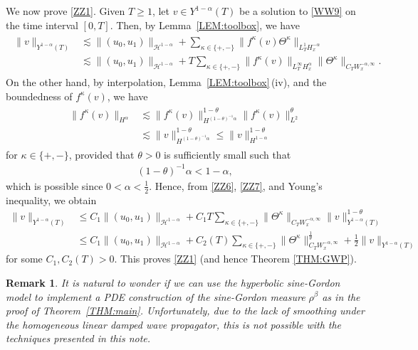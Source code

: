 \documentclass[letterpaper, 11pt,  reqno]{amsart}
\theoremstyle{myremark}
\newtheorem{remark}[theorem]{Remark}
\newcommand{\Ta}{\Theta}
\newcommand{\1}{\hspace{0.5mm}\text{I}\hspace{0.5mm}}
\newcommand{\al}{\alpha}
\newcommand{\be}{\beta}
\newcommand{\kk}{\kappa}
\newcommand{\ta}{\theta}
\newcommand{\les}{\lesssim}
\renewcommand{\H}{\mathcal{H}}
\numberwithin{equation}{section}
\numberwithin{theorem}{section}
\begin{document}
We now prove \eqref{ZZ1}.
Given $T \ge 1$, 
let $v \in Y^{1-\al}(T)$ be a solution to \eqref{WW9} on the time interval $[0, T]$.
Then, 
by 
Lemma~\ref{LEM:toolbox}, 
we have
\begin{align}
\begin{split}
\| v \|_ {Y^{1-\al}(T)} 
&\les \|(u_0, u_1) \|_{\H^{1-\al}}
+ \sum_{\kk \in \{+, -\}} \| f^\kk(v) \Ta^\kk  \|_{L^1_TH^{-\al}_x}\\
& \les
\|(u_0, u_1) \|_{\H^{1-\al}}
+   T
\sum_{\kk \in \{+, -\}}
  \|f^\kk(v) \|_{L^{\infty}_TH^\al_x}\|\Ta^\kk\|_{C_TW^{-\al,\infty}_x}.
\end{split}
\label{ZZ6}
\end{align}
On the other hand, 
by interpolation, Lemma~\ref{LEM:toolbox}\,(iv), 
and the boundedness of $f^\kk(v)$, 
we have 
\begin{align}
\begin{split}
\|f^\kk(v)\|_{H^\al } 
& \les \| f^\kk(v)\|_{H^{(1-\ta)^{-1}\al }}^{1-\ta} \|f^\kk(v)\|_{L^2}^\ta \\
& \les \| v\|_{H^{(1-\ta)^{-1}\al }}^{1-\ta}
 \le \| v\|_{H^{1-\al}}^{1-\ta}
\end{split}
\label{ZZ7}
\end{align}
for $\kk \in \{+, -\}$, provided that  $\ta >0$ is sufficiently small such that 
\begin{align*}
(1-\ta)^{-1}\al  < {1-\al}, 
\end{align*}
which is possible since $0 <  \al <  \frac 12$.
Hence, from \eqref{ZZ6}, \eqref{ZZ7}, and Young's inequality, 
we obtain
\begin{align*}
\|v\|_{Y^{1-\al}(T)}
&  \le C_1 \|(u_0, u_1) \|_{\H^{1-\al}}
 + 
C_1 T
\sum_{\kk \in \{+, -\}}
\|\Ta^\kk\|_{C_TW^{-\al,\infty}_x}
\|v\|_{Y^{1-\al}(T)}^{1-\ta}
\\
&  \le C_1 \|(u_0, u_1) \|_{\H^{1-\al}}
+ C_2(T)  \sum_{\kk \in \{+, -\}} \| \Ta^\kk \|_{C_T W_x^{-\al, \infty}}^\frac1 \ta + \frac{1}{2} 
\|v\|_{Y^{1-\al}(T)}
\end{align*}
for some $C_1, C_2(T) > 0$.
This proves \eqref{ZZ1}
(and hence Theorem \ref{THM:GWP}).










	







\begin{remark}\label{REM:wave2}
It is natural to wonder if we can use 
the hyperbolic sine-Gordon model
to 
 implement a PDE construction of the sine-Gordon measure $\rho^\be$ 
 as in the proof of Theorem~\ref{THM:main}.
 Unfortunately, 
due to  the lack of smoothing
under the homogeneous linear damped wave propagator, 
 this is not possible  with the techniques presented in this note.
\end{remark}
\end{document}
